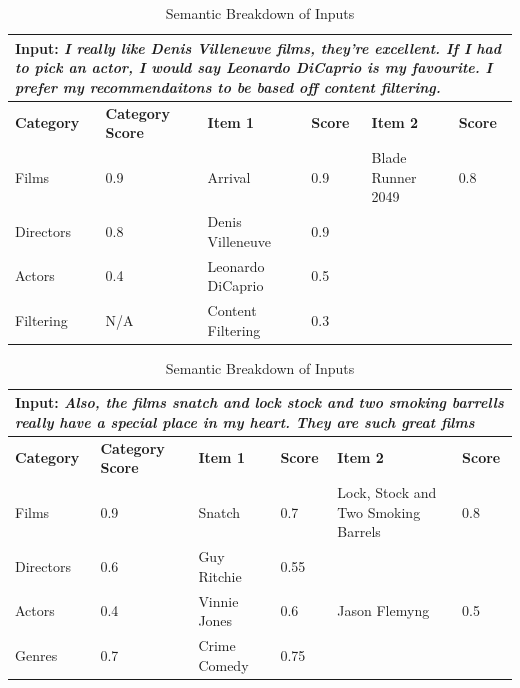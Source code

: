 \begin{table}[h!]
    \centering
    \begin{tabular}{|p{2cm}|p{1.5cm}|p{3cm}|p{1cm}|p{3cm}|p{1cm}|}
    \hline
    \multicolumn{6}{|p{0.9\textwidth}|}{\textbf{Input:} \textit{I really like Denis Villeneuve films, they're excellent. If I had to pick an actor, I would say Leonardo DiCaprio is my favourite. I prefer my recommendaitons to be based off content filtering.}} \\ \hline
    \textbf{Category} & \textbf{Category Score} & \textbf{Item 1} & \textbf{Score} & \textbf{Item 2} & \textbf{Score} \\ \hline
    Films   & 0.9          & Arrival                  & 0.9 & Blade Runner 2049       & 0.8    \\ \hline
    Directors       & 0.8  & Denis Villeneuve         & 0.9 & &   \\ \hline
    Actors         & 0.4   & Leonardo DiCaprio        & 0.5 & &   \\ \hline
    Filtering    &  N/A    & Content Filtering        & 0.3 & &   \\ \hline
    \end{tabular}
    \caption{Semantic Breakdown of Inputs}
    \label{tab:semantic_breakdown1}
\end{table}


\begin{table}[h!]
    \centering
    \begin{tabular}{|p{2cm}|p{1.5cm}|p{3cm}|p{1cm}|p{3cm}|p{1cm}|}
    \hline
    \multicolumn{6}{|p{0.9\textwidth}|}{\textbf{Input:} \textit{Also, the films snatch and lock stock and two smoking barrells really have a special place in my heart. They are such great films}} \\ \hline
    \textbf{Category} & \textbf{Category Score} & \textbf{Item 1} & \textbf{Score} & \textbf{Item 2} & \textbf{Score} \\ \hline
    Films     &  0.9     & Snatch          & 0.7   & Lock, Stock and Two Smoking Barrels & 0.8\\ \hline
    Directors    & 0.6     & Guy Ritchie      & 0.55 & &  \\ \hline
    Actors  &   0.4   & Vinnie Jones    & 0.6 & Jason Flemyng        & 0.5    \\ \hline
    Genres    & 0.7     & Crime Comedy       & 0.75 & &  \\ \hline
    \end{tabular}
    \caption{Semantic Breakdown of Inputs}
    \label{tab:semantic_breakdown2}
\end{table}

